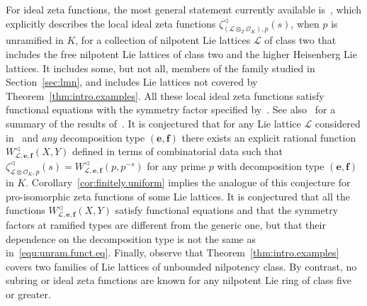 \documentclass[11pt,a4paper]{amsart}
\theoremstyle{plain}
\theoremstyle{remark}
\newcommand{\Z}{\mathbb{Z}}
\newcommand{\tensor}{\otimes}
\begin{document}
For ideal zeta functions, the most general statement currently available is~\cite[Theorem~4.21]{CSV/19}, which explicitly describes the local ideal zeta functions $\zeta^\vartriangleleft_{(\mathcal{L} \tensor_\Z \mathcal{O}_K),p}(s)$, when $p$ is unramified in $K$, for a collection of nilpotent Lie lattices $\mathcal{L}$ of class two that includes the free nilpotent Lie lattices of class two and the higher Heisenberg Lie lattices.  It includes some, but not all, members of the family studied in Section~\ref{sec:lmn}, and includes Lie lattices not covered by Theorem~\ref{thm:intro.examples}.  All these local ideal zeta functions satisfy functional equations with the symmetry factor specified by~\cite[Theorem~C]{Voll/10}.  See also~\cite{CSV/20} for a summary of the results of~\cite{CSV/19}.  It is conjectured that for 
any Lie lattice $\mathcal{L}$ considered in~\cite{CSV/19} and \emph{any} decomposition type $(\mathbf{e}, \mathbf{f})$ there exists an explicit rational function $W^\vartriangleleft_{\mathcal{L}, \mathbf{e}, \mathbf{f}}(X,Y)$ defined in terms of combinatorial data such that $\zeta^\vartriangleleft_{\mathcal{L} \tensor \mathcal{O}_K, p}(s) = W^\vartriangleleft_{\mathcal{L}, \mathbf{e}, \mathbf{f}}(p,p^{-s})$ for any prime $p$ with decomposition type $(\mathbf{e}, \mathbf{f})$ in $K$.  Corollary~\ref{cor:finitely.uniform} implies the analogue of this conjecture for pro-isomorphic zeta functions of some Lie lattices.  It is conjectured that all the functions $W^\vartriangleleft_{\mathcal{L}, \mathbf{e}, \mathbf{f}}(X,Y)$ satisfy functional equations and that the symmetry factors at ramified types are different from the generic one, but that their dependence on the decomposition type is not the same as in~\eqref{equ:unram.funct.eq}.  Finally, observe that Theorem~\ref{thm:intro.examples} covers two families of Lie lattices of unbounded nilpotency class.  By contrast, no subring or ideal zeta functions are known for any nilpotent Lie ring of class five or greater.
\end{document}

